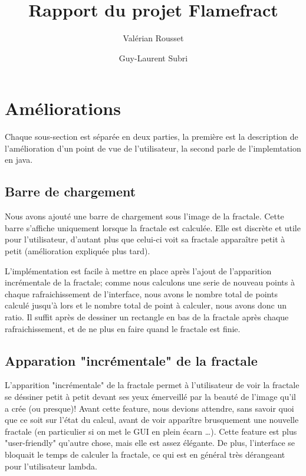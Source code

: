 \documentclass[a4paper]{article}
\author{Valérian Rousset \and Guy-Laurent Subri}
\title{Rapport du projet Flamefract}
\begin{document}
\maketitle

\section*{Améliorations}
Chaque sous-section est séparée en deux parties, la première est la description de l'amélioration d'un point de vue de l'utilisateur, la second parle de l'implemtation en java.

\subsection*{Barre de chargement}
Nous avons ajouté une barre de chargement sous l'image de la fractale. Cette barre s'affiche uniquement lorsque la fractale est calculée. Elle est discrète et utile pour l'utilisateur, d'autant plus que celui-ci voit sa fractale apparaître petit à petit (amélioration expliquée plus tard).

L'implémentation est facile à mettre en place après l'ajout de l'apparition incrémentale de la fractale; comme nous calculons une serie de nouveau points à chaque rafraichissement de l'interface, nous avons le nombre total de points calculé jusqu'à lors et le nombre total de point à calculer, nous avons donc un ratio. Il suffit après de dessiner un rectangle en bas de la fractale après chaque rafraichissement, et de ne plus en faire quand le fractale est finie.

\subsection*{Apparation "incrémentale" de la fractale}
L'apparition "incrémentale" de la fractale permet à l'utilisateur de voir la fractale se déssiner petit à petit devant ses yeux émerveillé par la beauté de l'image qu'il a crée (ou presque)! Avant cette feature, nous devions attendre, sans savoir quoi que ce soit sur l'état du calcul, avant de voir apparître brusquement une nouvelle fractale (en particulier si on met le GUI en plein écarn \ldots). Cette feature est plus "user-friendly" qu'autre chose, mais elle est assez élégante. De plus, l'interface se bloquait le temps de calculer la fractale, ce qui est en général très dérangeant pour l'utilisateur lambda.
\end{document}
